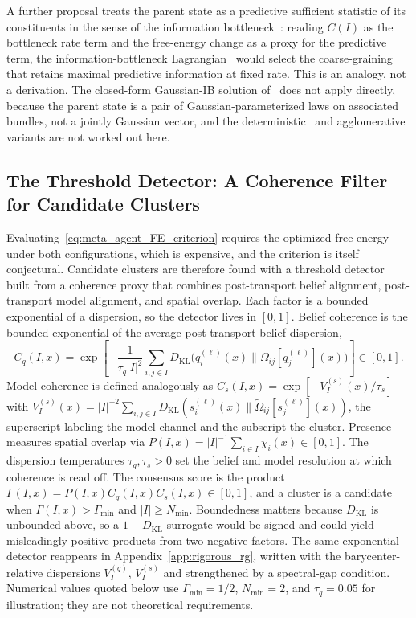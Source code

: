 A further proposal treats the parent state as a predictive sufficient statistic of its constituents in the sense of the information bottleneck~\cite{tishby1999information}: reading $C(I)$ as the bottleneck rate term and the free-energy change as a proxy for the predictive term, the information-bottleneck Lagrangian~\cite{bialek2001predictability} would select the coarse-graining that retains maximal predictive information at fixed rate. This is an analogy, not a derivation. The closed-form Gaussian-IB solution of~\cite{chechik2005information} does not apply directly, because the parent state is a pair of Gaussian-parameterized laws on associated bundles, not a jointly Gaussian vector, and the deterministic~\cite{StrouseSchwab2017} and agglomerative~\cite{SlonimTishby2000} variants are not worked out here.

\subsection{The Threshold Detector: A Coherence Filter for Candidate Clusters}
\label{sec:meta_agent_threshold}

Evaluating~\eqref{eq:meta_agent_FE_criterion} requires the optimized free energy under both configurations, which is expensive, and the criterion is itself conjectural. Candidate clusters are therefore found with a threshold detector built from a coherence proxy that combines post-transport belief alignment, post-transport model alignment, and spatial overlap. Each factor is a bounded exponential of a dispersion, so the detector lives in $[0, 1]$. Belief coherence is the bounded exponential of the average post-transport belief dispersion,
\begin{equation}
C_q(I, x) = \exp\left[-\frac{1}{\tau_q |I|^2}\sum_{i,j \in I} D_{\mathrm{KL}}\big(q_i^{(\ell)}(x) \| \Omega_{ij}[q_j^{(\ell)}](x)\big)\right] \in [0, 1].
\end{equation}
Model coherence is defined analogously as $C_s(I, x) = \exp[-V^{(s)}_I(x)/\tau_s]$ with $V^{(s)}_I(x) = |I|^{-2}\sum_{i,j \in I} D_{\mathrm{KL}}(s_i^{(\ell)}(x) \| \tilde{\Omega}_{ij}[s_j^{(\ell)}](x))$, the superscript labeling the model channel and the subscript the cluster. Presence measures spatial overlap via $P(I, x) = |I|^{-1}\sum_{i \in I} \chi_i(x) \in [0, 1]$. The dispersion temperatures $\tau_q, \tau_s > 0$ set the belief and model resolution at which coherence is read off. The consensus score is the product $\Gamma(I, x) = P(I, x) C_q(I, x) C_s(I, x) \in [0, 1]$, and a cluster is a candidate when $\Gamma(I, x) > \Gamma_{\min}$ and $|I| \geq N_{\min}$. Boundedness matters because $D_{\mathrm{KL}}$ is unbounded above, so a $1 - D_{\mathrm{KL}}$ surrogate would be signed and could yield misleadingly positive products from two negative factors. The same exponential detector reappears in Appendix~\ref{app:rigorous_rg}, written with the barycenter-relative dispersions $V_I^{(q)}$, $V_I^{(s)}$ and strengthened by a spectral-gap condition. Numerical values quoted below use $\Gamma_{\min} = 1/2$, $N_{\min} = 2$, and $\tau_q = 0.05$ for illustration; they are not theoretical requirements.

